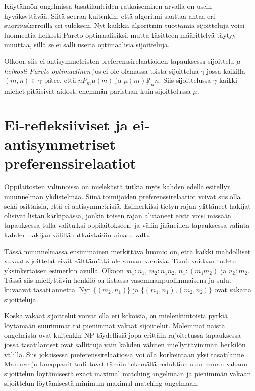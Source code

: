 \documentclass[gradu, twoside]{tktltiki}
\begin{document}
Käytännön ongelmissa tasatilanteiden ratkaiseminen arvalla on usein
hyväksyttävää. Siitä seuraa kuitenkin, että algoritmi saattaa antaa
eri suorituskerroilla eri tuloksen. Nyt kaikkia algoritmin tuottamia
sijoitteluja voisi luonnehtia heikosti Pareto-optimaalisiksi, mutta
käsitteen määrittelyä täytyy muuttaa, sillä se ei salli useita
optimaalisia sijoitteluja.

Olkoon siis ei-antisymmetristen preferenssirelaatioiden tapauksessa
sijoittelu $\mu$ \emph{heikosti Pareto-optimaalinen} jos ei ole
olemassa toista sijoittelua $\gamma$ jossa kaikilla $(m, n) \in
\gamma$ pätee, että $nP_m\mu(m)$ ja $\mu(m)\not P_mn$. Siis
sijoittelussa $\gamma$ kaikki miehet pitäisivät aidosti enemmän
paristaan kuin sijoittelussa $\mu$.

\section{Ei-refleksiiviset ja ei-antisymmetriset preferenssirelaatiot}

Oppilaitosten valinnoissa on mielekästä tutkia myös kahden edellä
esitellyn muunnelman yhdistelmää. Siinä toimijoiden
preferenssirelaatiot voivat siis olla sekä osittaisia, että
ei-antisymmetrisiä. Esimerkiksi tietyn rajan ylittäneet hakijat
olisivat listan kärkipäässä, jonkin toisen rajan alittaneet eivät
voisi missään tapauksessa tulla valituiksi oppilaitokseen, ja väliin
jääneiden tapauksessa valinta kahden hakijan välillä ratkaistaisiin
aina arvalla.

Tässä muunnelmassa ensimmäinen merkittävä huomio on, että kaikki
mahdolliset vakaat sijoittelut eivät välttämättä ole saman kokoisia.
Tämä voidaan todeta yksinkertaisen esimerkin avulla. Olkoon $m_1:
n_1$, $m_2: n_1 n_2$, $n_1: (m_1 m_2)$ ja $n_2: m_2$. Tässä siis
miellyttävin henkilö on listassa vasemmanpuolimmaisena ja sulut
kuvaavat tasatilannetta. Nyt $\{(m_2, n_1)\}$ ja $\{(m_1, n_1), (m_2,
n_2)\}$ ovat vakaita sijoitteluja. \cite{manlove02}

Koska vakaat sijoittelut voivat olla eri kokoisia, on mielenkiintoista
pyrkiä löytämään suurimmat tai pienimmät vakaat sijoittelut. Molemmat
näistä ongelmista ovat kuitenkin NP-täydellisiä jopa erittäin
rajoitetussa tapauksessa jossa tasatilanteet ovat sallittuja vain
kahden vähiten miellyttävimmän henkilön välillä. Siis jokaisessa
preferenssirelaatiossa voi olla korkeintaan yksi tasatilanne
\cite{manlove02}. Manlove ja kumppanit todistavat tämän tekemällä
reduktion suurimman vakaan sijoittelun löytämisestä exact maximal
matching ongelmaan ja pienimmän vakaan sijoittelun löytämisestä
minimum maximal matching ongelmaan.
\end{document}
